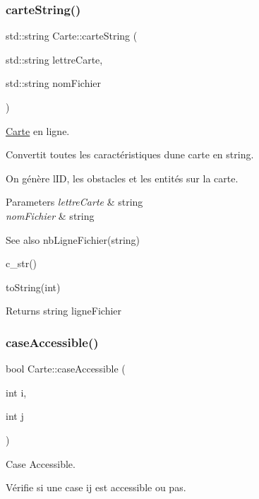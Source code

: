 \subsubsection{\texorpdfstring{carte\+String()}{carteString()}}
{\footnotesize\ttfamily std\+::string Carte\+::carte\+String (\begin{DoxyParamCaption}\item[{std\+::string}]{lettre\+Carte,  }\item[{std\+::string}]{nom\+Fichier }\end{DoxyParamCaption})}



\hyperlink{class_carte}{Carte} en ligne. 

Convertit toutes les caractéristiques d\textquotesingle{}une carte en string.

On génère l\textquotesingle{}ID, les obstacles et les entités sur la carte.


\begin{DoxyParams}{Parameters}
{\em lettre\+Carte} & string \\
\hline
{\em nom\+Fichier} & string \\
\hline
\end{DoxyParams}
\begin{DoxySeeAlso}{See also}
nb\+Ligne\+Fichier(string) 

c\+\_\+str() 

to\+String(int) 
\end{DoxySeeAlso}
\begin{DoxyReturn}{Returns}
string ligne\+Fichier 
\end{DoxyReturn}
\mbox{\label{class_carte_a3ea9d86aa5ace5a21216a23c7bfb1bab}} 
\subsubsection{\texorpdfstring{case\+Accessible()}{caseAccessible()}}
{\footnotesize\ttfamily bool Carte\+::case\+Accessible (\begin{DoxyParamCaption}\item[{int}]{i,  }\item[{int}]{j }\end{DoxyParamCaption})}



Case Accessible. 

Vérifie si une case ij est accessible ou pas.


